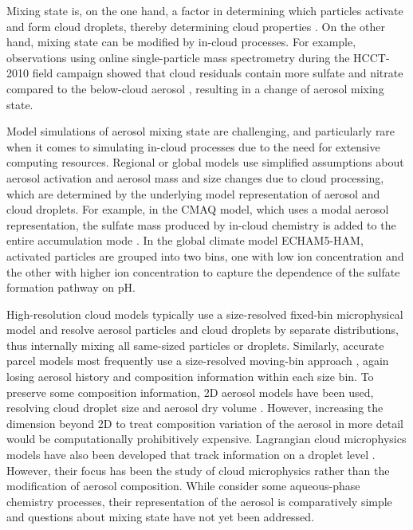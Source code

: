 \documentclass[edeposit,fullpage]{uiucthesis2009}
\begin{document}
Mixing state is, on the one hand, a factor in determining which
particles activate and form cloud droplets, thereby determining cloud
properties \citep{ching2012impacts,Ching2016}. On the other hand,
mixing state can be modified by in-cloud processes. For example,
observations using online single-particle mass spectrometry during the
HCCT-2010 field campaign showed that cloud residuals contain more
sulfate and nitrate compared to the below-cloud aerosol
\citep{Roth2016}, resulting in a change of aerosol mixing state.

Model simulations of aerosol mixing state are challenging, and
particularly rare when it comes to simulating in-cloud processes due
to the need for extensive computing resources.  Regional or global
models use simplified assumptions about aerosol activation and aerosol
mass and size changes due to cloud processing, which are determined by
the underlying model representation of aerosol and cloud droplets. For
example, in the CMAQ model, which uses a modal aerosol representation,
the sulfate mass produced by in-cloud chemistry is added to the entire
accumulation mode \citep{Ervens2015, Fahey2017}. In the global
  climate model ECHAM5-HAM, activated particles are grouped into two
  bins, one with low ion concentration and the other with higher ion
  concentration \citep{roelofs2006aerosol} to capture the dependence of
  the sulfate formation pathway on pH.

High-resolution cloud models typically use a size-resolved fixed-bin
microphysical model \citep{Flossmann1994,Feingold1996} and resolve
aerosol particles and cloud droplets by separate distributions, thus
internally mixing all same-sized particles or droplets. Similarly,
accurate parcel models most frequently use a size-resolved moving-bin
approach \citep{Kreidenweis2003,Cooper1997}, again losing aerosol
history and composition information within each size bin. To preserve
some composition information, 2D aerosol models have been used,
resolving cloud droplet size and aerosol dry volume
\citep{Bott1996,Ovchinnikov2010}. However, increasing the dimension
beyond 2D to treat composition variation of the aerosol in more detail
would be computationally prohibitively expensive. Lagrangian cloud
microphysics models have also been developed that track
information on a droplet level \citep{Shima2009,
  Andrejczuk2008,Grabowski2019,Soelch2010,
  Unterstrasser2014,Jaruga2018}. However, their focus has been the
study of cloud microphysics rather than the modification of aerosol
composition. While \citet{Jaruga2018} consider some aqueous-phase
chemistry processes, their representation of the aerosol is
comparatively simple and questions about mixing state have not yet
been addressed.
\end{document}
